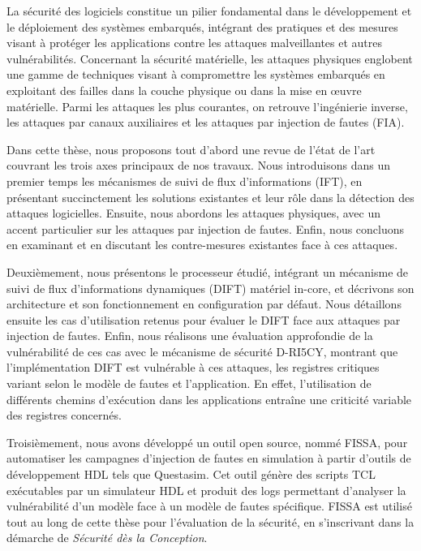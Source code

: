 La sécurité des logiciels constitue un pilier fondamental dans le développement et le déploiement des systèmes embarqués, intégrant des pratiques et des mesures visant à protéger les applications contre les attaques malveillantes et autres vulnérabilités. Concernant la sécurité matérielle, les attaques physiques englobent une gamme de techniques visant à compromettre les systèmes embarqués en exploitant des failles dans la couche physique ou dans la mise en œuvre matérielle. Parmi les attaques les plus courantes, on retrouve l’ingénierie inverse, les attaques par canaux auxiliaires et les attaques par injection de fautes (FIA).

Dans cette thèse, nous proposons tout d’abord une revue de l’état de l’art couvrant les trois axes principaux de nos travaux. Nous introduisons dans un premier temps les mécanismes de suivi de flux d’informations (IFT), en présentant succinctement les solutions existantes et leur rôle dans la détection des attaques logicielles. Ensuite, nous abordons les attaques physiques, avec un accent particulier sur les attaques par injection de fautes. Enfin, nous concluons en examinant et en discutant les contre-mesures existantes face à ces attaques.

Deuxièmement, nous présentons le processeur étudié, intégrant un mécanisme de suivi de flux d’informations dynamiques (DIFT) matériel in-core, et décrivons son architecture et son fonctionnement en configuration par défaut. Nous détaillons ensuite les cas d'utilisation retenus pour évaluer le DIFT face aux attaques par injection de fautes. Enfin, nous réalisons une évaluation approfondie de la vulnérabilité de ces cas avec le mécanisme de sécurité D-RI5CY, montrant que l'implémentation DIFT est vulnérable à ces attaques, les registres critiques variant selon le modèle de fautes et l'application. En effet, l’utilisation de différents chemins d’exécution dans les applications entraîne une criticité variable des registres concernés.

Troisièmement, nous avons développé un outil open source, nommé FISSA, pour automatiser les campagnes d’injection de fautes en simulation à partir d'outils de développement HDL tels que Questasim. Cet outil génère des scripts TCL exécutables par un simulateur HDL et produit des logs permettant d’analyser la vulnérabilité d’un modèle face à un modèle de fautes spécifique. FISSA est utilisé tout au long de cette thèse pour l’évaluation de la sécurité, en s’inscrivant dans la démarche de \textit{Sécurité dès la Conception}.


